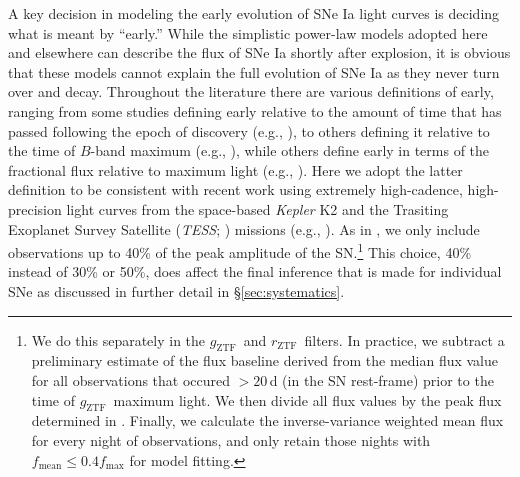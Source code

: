 \documentclass[twocolumn]{./aastex63}
\newcommand{\rztf}{$r_\mathrm{ZTF}$}
\newcommand{\gztf}{$g_\mathrm{ZTF}$}
\begin{document}


A key decision in modeling the early evolution of SNe Ia light curves is
deciding what is meant by ``early.'' While the simplistic power-law models
adopted here and elsewhere can describe the flux of SNe Ia shortly after
explosion, it is obvious that these models cannot explain the full evolution
of SNe Ia as they never turn over and decay. Throughout the literature there
are various definitions of early, ranging from some studies defining early
relative to the amount of time that has passed following the epoch of
discovery (e.g., \citealt{Zheng13,Miller18}), to others defining it relative
to the time of $B$-band maximum (e.g., \citealt{Riess99a,Conley06}), while
others define early in terms of the fractional flux relative to maximum light
(e.g., \citealt{Olling15,Firth15,Fausnaugh19}). Here we adopt the latter
definition to be consistent with recent work using extremely high-cadence,
high-precision light curves from the space-based \textit{Kepler} K2
\citep{Howell14} and the Trasiting Exoplanet Survey Satellite (\textit{TESS};
\citealt{Ricker15}) missions (e.g., \citealt{Olling15,Fausnaugh19}). As in
\citet{Olling15}, we only include observations up to 40\% of the peak
amplitude of the SN.\footnote{We do this separately in the \gztf\ and \rztf\
filters. In practice, we subtract a preliminary estimate of the flux baseline
derived from the median flux value for all observations that occured $>20$\,d
(in the SN rest-frame) prior to the time of \gztf\ maximum light. We then
divide all flux values by the peak flux determined in \citet{Yao19}. Finally,
we calculate the inverse-variance weighted mean flux for every night of
observations, and only retain those nights with $f_\mathrm{mean} \le 0.4
f_\mathrm{max}$ for model fitting.} This choice, 40\% instead of 30\% or
50\%, does affect the final inference that is made for individual SNe as
discussed in further detail in \S\ref{sec:systematics}.
\end{document}
